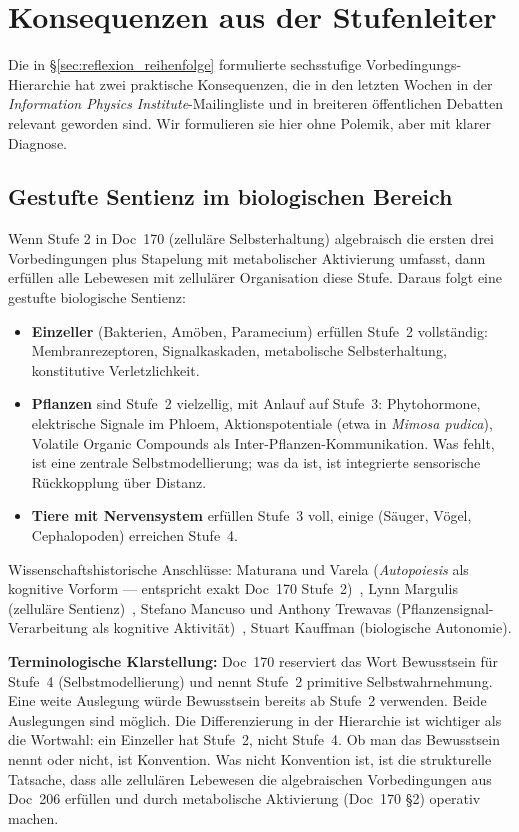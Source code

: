 \section{Konsequenzen aus der Stufenleiter}\label{sec:konsequenzen}

Die in \S\ref{sec:reflexion_reihenfolge} formulierte sechsstufige Vorbedingungs-Hierarchie hat zwei praktische Konsequenzen, die in den letzten Wochen in der \emph{Information Physics Institute}-Mailingliste und in breiteren öffentlichen Debatten relevant geworden sind. Wir formulieren sie hier ohne Polemik, aber mit klarer Diagnose.

\subsection{Gestufte Sentienz im biologischen Bereich}\label{sec:konsequenzen_bio}

Wenn Stufe 2 in Doc~170 (zelluläre Selbsterhaltung) algebraisch die ersten drei Vorbedingungen plus Stapelung mit metabolischer Aktivierung umfasst, dann erfüllen alle Lebewesen mit zellulärer Organisation diese Stufe. Daraus folgt eine gestufte biologische Sentienz:

\begin{itemize}
\item \textbf{Einzeller} (Bakterien, Amöben, Paramecium) erfüllen Stufe~2 vollständig: Membranrezeptoren, Signalkaskaden, metabolische Selbsterhaltung, konstitutive Verletzlichkeit.
\item \textbf{Pflanzen} sind Stufe~2 vielzellig, mit Anlauf auf Stufe~3: Phytohormone, elektrische Signale im Phloem, Aktionspotentiale (etwa in \emph{Mimosa pudica}), Volatile Organic Compounds als Inter-Pflanzen-Kommunikation. Was fehlt, ist eine zentrale Selbstmodellierung; was da ist, ist integrierte sensorische Rückkopplung über Distanz.
\item \textbf{Tiere mit Nervensystem} erfüllen Stufe~3 voll, einige (Säuger, Vögel, Cephalopoden) erreichen Stufe~4.
\end{itemize}

Wissenschaftshistorische Anschlüsse: Maturana und Varela (\emph{Autopoiesis} als kognitive Vorform --- entspricht exakt Doc~170 Stufe~2)~\cite{MaturanaVarela1980}, Lynn Margulis (zelluläre Sentienz)~\cite{Margulis2001}, Stefano Mancuso und Anthony Trewavas (Pflanzensignal-Verarbeitung als kognitive Aktivität)~\cite{Mancuso2018,Trewavas2014}, Stuart Kauffman (biologische Autonomie).

\textbf{Terminologische Klarstellung:} Doc~170 reserviert das Wort \glqq Bewusstsein\grqq{} für Stufe~4 (Selbstmodellierung) und nennt Stufe~2 \glqq primitive Selbstwahrnehmung\grqq{}. Eine weite Auslegung würde \glqq Bewusstsein\grqq{} bereits ab Stufe~2 verwenden. Beide Auslegungen sind möglich. Die Differenzierung in der Hierarchie ist wichtiger als die Wortwahl: ein Einzeller hat Stufe~2, nicht Stufe~4. Ob man das \glqq Bewusstsein\grqq{} nennt oder nicht, ist Konvention. Was nicht Konvention ist, ist die strukturelle Tatsache, dass alle zellulären Lebewesen die algebraischen Vorbedingungen aus Doc~206 erfüllen und durch metabolische Aktivierung (Doc~170 \S2) operativ machen.

